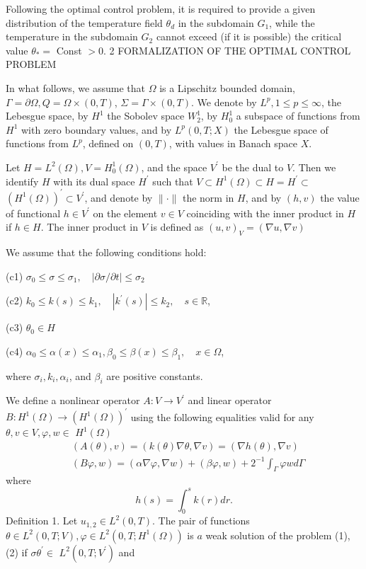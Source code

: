 \documentclass[10pt]{article}
\begin{document}
Following the optimal control problem, it is required to provide a given distribution of the temperature field $\theta_{d}$ in the subdomain $G_{1}$, while the temperature in the subdomain $G_{2}$ cannot exceed (if it is possible) the critical value $\theta_{*}=$ Const $>0$. 2 FORMALIZATION OF THE OPTIMAL CONTROL PROBLEM

In what follows, we assume that $\Omega$ is a Lipschitz bounded domain, $\Gamma=\partial \Omega, Q=\Omega \times(0, T)$, $\Sigma=\Gamma \times(0, T)$. We denote by $L^{p}, 1 \leq p \leq \infty$, the Lebesgue space, by $H^{1}$ the Sobolev space $W_{2}^{1}$, by $H_{0}^{1}$ a subspace of functions from $H^{1}$ with zero boundary values, and by $L^{p}(0, T ; X)$ the Lebesgue space of functions from $L^{p}$, defined on $(0, T)$, with values in Banach space $X$.

Let $H=L^{2}(\Omega), V=H_{0}^{1}(\Omega)$, and the space $V^{\prime}$ be the dual to $V$. Then we identify $H$ with its dual space $H^{\prime}$ such that $V \subset H^{1}(\Omega) \subset H=H^{\prime} \subset$ $\left(H^{1}(\Omega)\right)^{\prime} \subset V^{\prime}$, and denote by $\|\cdot\|$ the norm in $H$, and by $(h, v)$ the value of functional $h \in V^{\prime}$ on the element $v \in V$ coinciding with the inner product in $H$ if $h \in H$. The inner product in $V$ is defined as $(u, v)_{V}=(\nabla u, \nabla v)$

We assume that the following conditions hold:

(c1) $\sigma_{0} \leq \sigma \leq \sigma_{1}, \quad|\partial \sigma / \partial t| \leq \sigma_{2}$

(c2) $k_{0} \leq k(s) \leq k_{1}, \quad\left|k^{\prime}(s)\right| \leq k_{2}, \quad s \in \mathbb{R}$,

(c3) $\theta_{0} \in H$

(c4) $\alpha_{0} \leq \alpha(x) \leq \alpha_{1}, \beta_{0} \leq \beta(x) \leq \beta_{1}, \quad x \in \Omega$,

where $\sigma_{i}, k_{i}, \alpha_{i}$, and $\beta_{i}$ are positive constants.

We define a nonlinear operator $A: V \rightarrow V^{\prime}$ and linear operator $B: H^{1}(\Omega) \rightarrow\left(H^{1}(\Omega)\right)^{\prime}$ using the following equalities valid for any $\theta, v \in V, \varphi, w \in$ $H^{1}(\Omega)$
$$
\begin{aligned}
&(A(\theta), v)=(k(\theta) \nabla \theta, \nabla v)=(\nabla h(\theta), \nabla v) \\
&(B \varphi, w)=(\alpha \nabla \varphi, \nabla w)+(\beta \varphi, w)+2^{-1} \int_{\Gamma} \varphi w d \Gamma
\end{aligned}
$$
where
$$
h(s)=\int_{0}^{s} k(r) d r .
$$
Definition 1. Let $u_{1,2} \in L^{2}(0, T)$. The pair of functions $\theta \in L^{2}(0, T ; V), \varphi \in L^{2}\left(0, T ; H^{1}(\Omega)\right)$ is $a$ weak solution of the problem (1), (2) if $\sigma \theta^{\prime} \in$ $L^{2}\left(0, T ; V^{\prime}\right)$ and
\end{document}
